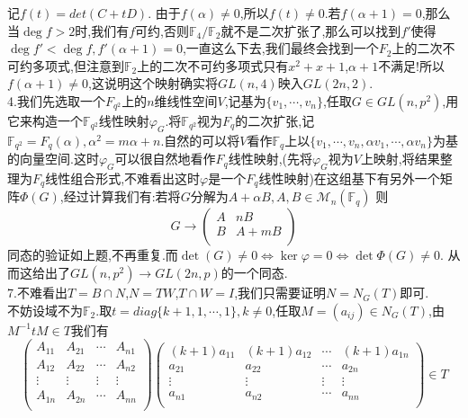 \documentclass[b5paper]{ctexart}
\begin{document}
记$f(t)=det\left( C+tD\right)$.
由于$f(\alpha)\neq 0$,所以$f(t)\neq 0$.若$f(\alpha+1)=0$,那么当$\deg{f}>2$时,我们有$f$可约,否则$\mathbb{F}_4/\mathbb{F}_2$就不是二次扩张了,那么可以找到$f'$使得$\deg{f'}<\deg{f},f'(\alpha+1)=0$,一直这么下去,我们最终会找到一个$F_2$上的二次不可约多项式,但注意到$\mathbb{F}_2$上的二次不可约多项式只有$x^2+x+1$,$\alpha+1$不满足!所以$f(\alpha+1)\neq 0$,这说明这个映射确实将$GL(n,4)$映入$GL(2n,2)$.\\
4.我们先选取一个$F_{q^2}$上的$n$维线性空间$V$,记基为$\{v_1,\cdots,v_n\}$,任取$G\in GL(n,p^2)$,用它来构造一个$\mathbb{F}_{q^2}$线性映射$\varphi_G$.将$\mathbb{F}_{q^2}$视为$F_{q}$的二次扩张,记$\mathbb{F}_{q^2}=F_{q}(\alpha),\alpha^2=m\alpha+n$.自然的可以将$V$看作$\mathbb{F}_q$上以$\{v_1,\cdots,v_n,\alpha v_1,\cdots,\alpha v_n\}$为基的向量空间.这时$\varphi_G$可以很自然地看作$F_q$线性映射,(先将$\varphi_G$视为$V$上映射,将结果整理为$F_q$线性组合形式,不难看出这时$\varphi$是一个$F_q$线性映射)在这组基下有另外一个矩阵$\Phi(G)$,经过计算我们有:若将$G$分解为$A+\alpha B,A,B\in \mathcal{M}_n(\mathbb{F}_q)$
则
\[G\to \left(\begin{array}{cc}
A & nB\\
B & A+mB\\
\end{array} \right) \]
同态的验证如上题,不再重复.而$\det(G)\neq 0\Leftrightarrow \ker\varphi=0\Leftrightarrow  \det{\Phi(G)}\neq 0.$
从而这给出了$GL(n,p^2)\to GL(2n,p)$的一个同态.\\
7.不难看出$T=B\cap N$,$N=TW$,$T\cap W=I$,我们只需要证明$N=N_G(T)$即可.\\
不妨设域不为$\mathbb{F}_2$.取$t=diag\{k+1,1,\cdots,1\},k\neq 0$,任取$M=(a_{ij})\in N_G(T)$,由$M^{-1}tM\in T$我们有
\[\left( \begin{array}{cccc}
A_{11} & A_{21} & \cdots & A_{n1}\\
A_{12} & A_{22} & \cdots & A_{n2}\\
\vdots & \vdots & \vdots & \vdots\\
A_{1n} & A_{2n} & \cdots & A_{nn}\\
\end{array}\right)\left( \begin{array}{cccc}
(k+1)a_{11} & (k+1)a_{12} & \cdots & (k+1)a_{1n}\\
a_{21} & a_{22} & \cdots & a_{2n}\\
\vdots & \vdots & \vdots & \vdots\\
a_{n1} & a_{n2} & \cdots & a_{nn}\\
\end{array}\right)\in T  \]
\end{document}
